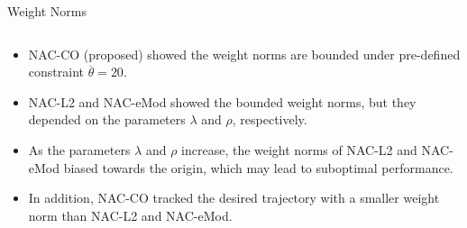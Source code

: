 \documentclass[8pt, aspectratio=169, handout]{beamer}
\begin{document}
\begin{frame}{\insertsubsectionhead}{Weight Norms}
\begin{columns}
  \end{columns}

  \begin{itemize}
    \item NAC-CO (proposed) showed the weight norms are bounded under pre-defined constraint $\overline{\theta}=20$.
    \item NAC-L2 and NAC-eMod showed the bounded weight norms, but they depended on the parameters $\lambda$ and $\rho$, respectively.
    \item As the parameters $\lambda$ and $\rho$ increase, the weight norms of NAC-L2 and NAC-eMod biased towards the origin, which may lead to suboptimal performance.
    \item In addition, NAC-CO tracked the desired trajectory with a smaller weight norm than NAC-L2 and NAC-eMod.
  \end{itemize}

\end{frame}
\end{document}
